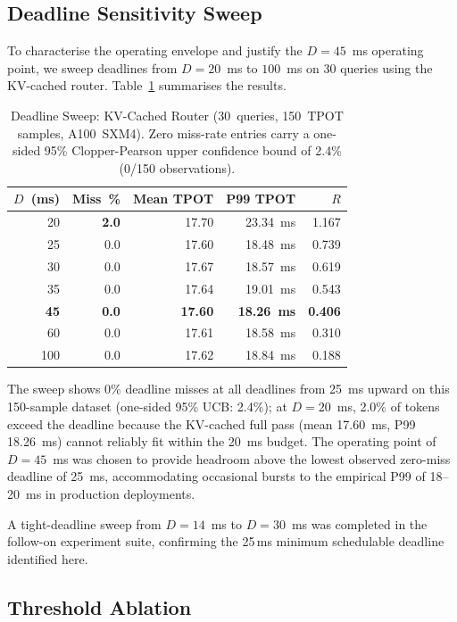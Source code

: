 \documentclass[conference]{IEEEtran}
\begin{document}
\subsection{Deadline Sensitivity Sweep}
\label{sec:sweep}

To characterise the operating envelope and justify the $D=45$~ms
operating point, we sweep deadlines from $D=20$~ms to $100$~ms on
30 queries using the KV-cached router.
Table~\ref{tab:sweep} summarises the results.

\begin{table}[htbp]
\caption{Deadline Sweep: KV-Cached Router (30~queries, 150~TPOT samples, A100~SXM4).
         Zero miss-rate entries carry a one-sided 95\% Clopper-Pearson
         upper confidence bound of 2.4\% (0/150 observations).}
\centering
\setlength{\tabcolsep}{3pt}
\begin{tabular}{@{}rrrrr@{}}
\toprule
$D$~(ms) & Miss~\% & Mean TPOT & P99 TPOT & $R$ \\
\midrule
20 & \textbf{2.0} & 17.70 & 23.34~ms & 1.167 \\
25 & 0.0 & 17.60 & 18.48~ms & 0.739 \\
30 & 0.0 & 17.67 & 18.57~ms & 0.619 \\
35 & 0.0 & 17.64 & 19.01~ms & 0.543 \\
\textbf{45} & \textbf{0.0} & \textbf{17.60} & \textbf{18.26~ms} & \textbf{0.406} \\
60  & 0.0 & 17.61 & 18.58~ms & 0.310 \\
100 & 0.0 & 17.62 & 18.84~ms & 0.188 \\
\bottomrule
\end{tabular}
\label{tab:sweep}
\end{table}

The sweep shows 0\% deadline misses at all deadlines from 25~ms upward
on this 150-sample dataset (one-sided 95\% UCB: 2.4\%); at $D=20$~ms,
2.0\% of tokens exceed the deadline because the KV-cached full pass
(mean 17.60~ms, P99 18.26~ms) cannot reliably fit within the 20~ms budget.
The operating point of $D=45$~ms was chosen to provide headroom above
the lowest observed zero-miss deadline of 25~ms, accommodating occasional
bursts to the empirical P99 of 18--20~ms in production deployments.

A tight-deadline sweep from $D=14$~ms to $D=30$~ms was completed in
the follow-on experiment suite, confirming the 25\,ms minimum schedulable
deadline identified here.

\subsection{Threshold Ablation}
\label{sec:threshold}
\end{document}
